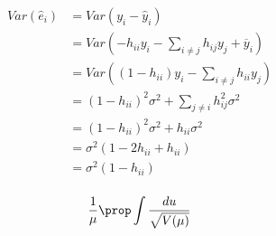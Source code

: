 \documentclass[11pt]{article}
\begin{document}
\begin{align*}
    Var(\hat{e}_i) &= Var(y_i - \hat{y}_i)\\ 
    &= Var(-h_{ii} y_i - \sum_{i\neq j} h_{ij} y_j + \overline{y}_i) \\
    &= Var((1-h_{ii})y_i - \sum_{i\neq j} h_{ii} y_j) \\
    &= (1-h_{ii})^2 \sigma^2 + \sum_{j\neq i} h_{ij}^2 \sigma^2 \\
    &= (1-h_{ii})^2 \sigma^2 + h_{ii} \sigma^2 \\    
    &= \sigma^2 (1-2h_{ii} + h_{ii})\\
    &=\sigma^2 (1-h_{ii})\\
\end{align*}


\begin{align*}
    \frac{1}{\mu} &\prop \int \frac{du}{\sqrt{V(\mu)}}\\
\end{align*}
\end{document}
